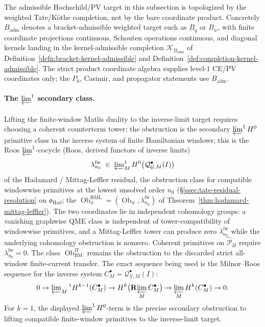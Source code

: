 \documentclass[11pt]{memoir}
\begin{document}
The admissible Hochschild/PV target in this subsection is topologized by
the weighted Tate/K\"othe completion, not by the bare coordinate product.
Concretely \(B_{\mathrm{adm}}\) denotes a bracket-admissible
weighted target such as \(B_q\) or \(B_w\), with finite coordinate
projections continuous, Schouten operations continuous, and diagonal
kernels landing in the kernel-admissible completion
\(\mathcal K_{B_{\mathrm{adm}}}\) of
Definition~\ref{defn:bracket-kernel-admissible} and
Definition~\ref{def:completion-kernel-admissible}.  The strict product
coordinate algebra supplies level-\(1\) CE/PV coordinates only; the
\(P_0\), Casimir, and propagator statements use \(B_{\mathrm{adm}}\).

\paragraph{The \texorpdfstring{$\varprojlim^1$}{lim-1} secondary class.}
Lifting the finite-window Matlis duality to the inverse-limit target
requires choosing a coherent counterterm tower; the obstruction is the
secondary
\(\varprojlim^1H^0\) primitive class in the inverse system of finite
Hamiltonian windows; this is the Roos
\(\varprojlim^1\)-cocycle (Roos, derived functors of inverse limits)
\[
  \lambda^{\mathrm{fw}}_{n_0}
    \;\in\;\varprojlim\nolimits^1_M
      H^0\bigl(\mathcal Q^\bullet_{\mathcal G,M}(I)\bigr)
\]
of the Hadamard / Mittag-Leffler residual, the obstruction class for
compatible windowwise primitives at the lowest unsolved order
\(n_0\) (\S\ref{ssec:tate-residual-resolution} on
\(\mathfrak o_{\mathrm{Had}}\); the
\(\operatorname{Ob}^{\mathrm{HML}}_w=
(\operatorname{Ob}_w,\lambda^{\mathrm{fw}}_{n_0})\) of
Theorem~\ref{thm:hadamard-mittag-leffler}).  The two coordinates lie
in independent cohomology groups: a vanishing graphwise QME class
is independent of tower-compatibility of windowwise primitives, and a
Mittag-Leffler tower can produce zero
\(\lambda^{\mathrm{fw}}_{n_0}\) while the underlying cohomology
obstruction is nonzero.  Coherent primitives on
\(\widehat{\mathcal P}_\Pi\) require
\(\lambda^{\mathrm{fw}}_{n_0}=0\).  The class
\(\operatorname{Ob}^\Pi_{\mathrm{BM}}\) remains the obstruction to the
discarded strict all-window finite-current transfer.
The exact sequence being used is the Milnor--Roos sequence for the
inverse system \(C_M^\bullet=\mathcal Q^\bullet_{\mathcal G,M}(I)\):
\[
  0\to
  \varprojlim\nolimits_M{}^1 H^{k-1}(C_M^\bullet)
  \to
  H^k\bigl(\mathbf R\!\varprojlim_M C_M^\bullet\bigr)
  \to
  \varprojlim_M H^k(C_M^\bullet)
  \to 0 .
\]
For \(k=1\), the displayed \(\varprojlim^1H^0\)-term is the precise
secondary obstruction to lifting compatible finite-window primitives to
the inverse-limit target.
\end{document}
